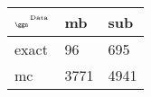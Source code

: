 \begin{tabular}{lll}
    \toprule
    $_{\text{\tiny{\ggn}}}$$^{\text{\tiny{Data}}}$ & mb & sub \\
    \midrule
    exact & 96
              & 695 \\
    mc   & 3771
              & 4941 \\
    \bottomrule
\end{tabular}